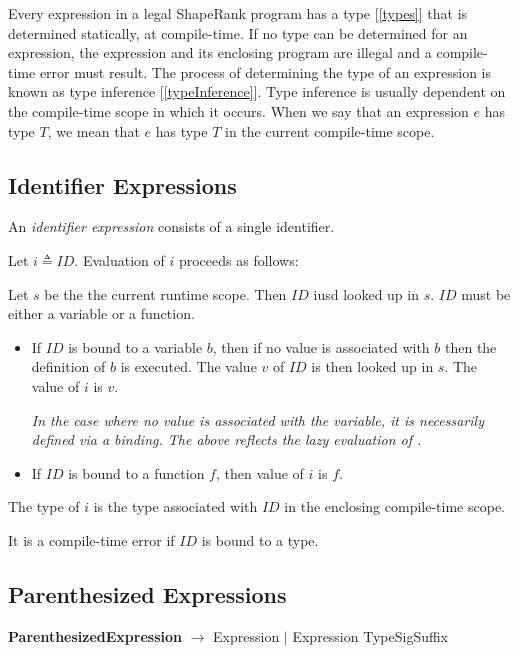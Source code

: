 \documentclass{article}
\begin{document}
Every expression in a legal ShapeRank program has a type [\ref{types}] that is determined statically, at compile-time. If no type can be determined for an expression, the expression and its enclosing program are illegal and a compile-time error must result. The process of determining the type of an expression is known as type inference [\ref{typeInference}]. Type inference  is usually dependent on the compile-time scope in which it occurs. When we say that an expression $e$ has type $T$, we mean that $e$ has type $T$ in the current compile-time scope.

\subsection{Identifier Expressions}
\label{identifierExpressions}

An {\em identifier expression} consists of a single identifier.

\IdentifierExpression{}

Let $i \triangleq ID$.
Evaluation of $i$ proceeds as follows:


Let $s$ be the the current runtime scope. Then $ID$ iusd looked up in $s$. $ID$ must be either a variable or a function.
\begin{itemize}
\item If $ID$ is bound to a variable $b$, then if no value is associated with $b$ then the definition of $b$ is executed. The value $v$ of $ID$ is then looked up in $s$. The value of $i$ is $v$.

{\em In the case where no value is associated with the variable, it is necessarily defined via  a \LET{} binding. The above reflects the lazy evaluation of \LET{}.}

\item If $ID$ is bound to a function $f$, then value of $i$ is $f$. 
\end{itemize}

The type of $i$ is the type associated with $ID$ in the enclosing compile-time scope.

It is a compile-time error if $ID$ is bound to a type. 


\subsection{Parenthesized Expressions}
\label{parenthesizedExpressions}

{\bf ParenthesizedExpression} $\rightarrow$ \LPAREN{} Expression \RPAREN{} $|$ \LPAREN{} Expression TypeSigSuffix \RPAREN{}
\end{document}
